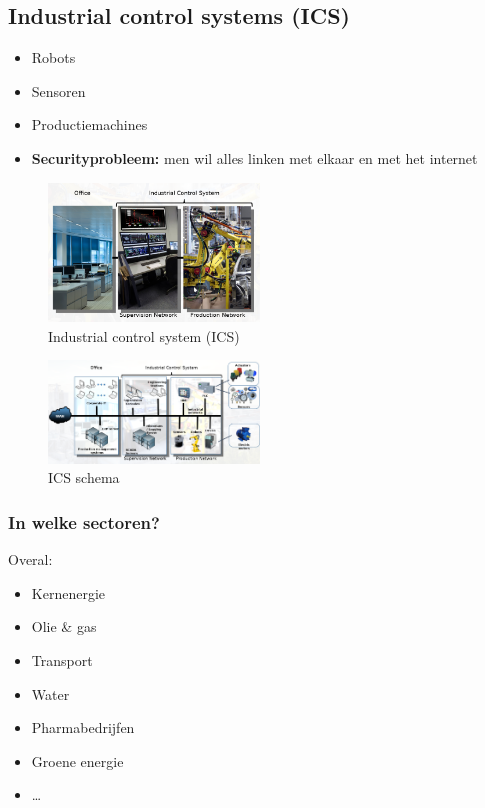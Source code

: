 \documentclass{article}
\newcommand{\bold}[1]{\textbf{#1}}
\begin{document}
\subsection{Industrial control systems (ICS)}

\begin{itemize}
    \item Robots
    \item Sensoren
    \item Productiemachines
    \item \bold{Securityprobleem:} men wil alles linken met elkaar en met het internet
\end{itemize}

\begin{figure}[H]
    \centering
    \includegraphics[width=0.5\textwidth]{iot-industrial-control-systems.png}
    \caption{Industrial control system (ICS)}
\end{figure}

\begin{figure}[H]
    \centering
    \includegraphics[width=0.5\textwidth]{iot-ics2.png}
    \caption{ICS schema}
\end{figure}

\subsubsection{In welke sectoren?}

Overal:

\begin{itemize}
    \item Kernenergie
    \item Olie \& gas
    \item Transport
    \item Water
    \item Pharmabedrijfen
    \item Groene energie
    \item \dots
\end{itemize}
\end{document}
